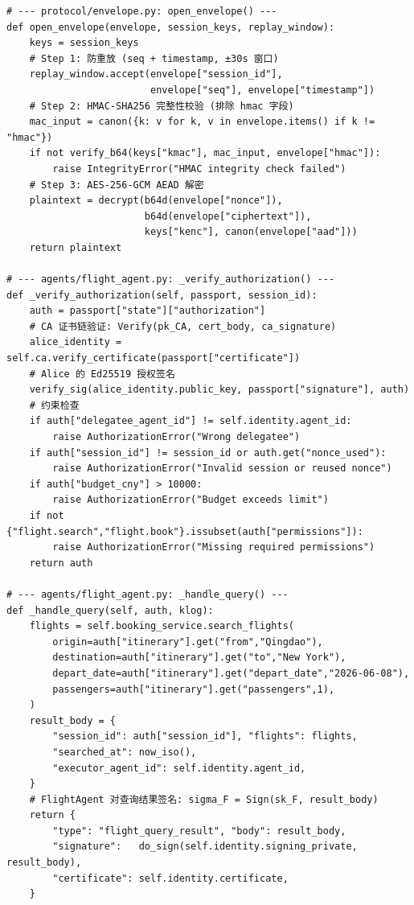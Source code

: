 \begin{lstlisting}[caption={protocol/envelope.py — open\_envelope() ; agents/flight\_agent.py — \_verify\_authorization() \& \_handle\_query()}]
# --- protocol/envelope.py: open_envelope() ---
def open_envelope(envelope, session_keys, replay_window):
    keys = session_keys
    # Step 1: 防重放 (seq + timestamp, ±30s 窗口)
    replay_window.accept(envelope["session_id"],
                         envelope["seq"], envelope["timestamp"])
    # Step 2: HMAC-SHA256 完整性校验 (排除 hmac 字段)
    mac_input = canon({k: v for k, v in envelope.items() if k != "hmac"})
    if not verify_b64(keys["kmac"], mac_input, envelope["hmac"]):
        raise IntegrityError("HMAC integrity check failed")
    # Step 3: AES-256-GCM AEAD 解密
    plaintext = decrypt(b64d(envelope["nonce"]),
                        b64d(envelope["ciphertext"]),
                        keys["kenc"], canon(envelope["aad"]))
    return plaintext

# --- agents/flight_agent.py: _verify_authorization() ---
def _verify_authorization(self, passport, session_id):
    auth = passport["state"]["authorization"]
    # CA 证书链验证: Verify(pk_CA, cert_body, ca_signature)
    alice_identity = self.ca.verify_certificate(passport["certificate"])
    # Alice 的 Ed25519 授权签名
    verify_sig(alice_identity.public_key, passport["signature"], auth)
    # 约束检查
    if auth["delegatee_agent_id"] != self.identity.agent_id:
        raise AuthorizationError("Wrong delegatee")
    if auth["session_id"] != session_id or auth.get("nonce_used"):
        raise AuthorizationError("Invalid session or reused nonce")
    if auth["budget_cny"] > 10000:
        raise AuthorizationError("Budget exceeds limit")
    if not {"flight.search","flight.book"}.issubset(auth["permissions"]):
        raise AuthorizationError("Missing required permissions")
    return auth

# --- agents/flight_agent.py: _handle_query() ---
def _handle_query(self, auth, klog):
    flights = self.booking_service.search_flights(
        origin=auth["itinerary"].get("from","Qingdao"),
        destination=auth["itinerary"].get("to","New York"),
        depart_date=auth["itinerary"].get("depart_date","2026-06-08"),
        passengers=auth["itinerary"].get("passengers",1),
    )
    result_body = {
        "session_id": auth["session_id"], "flights": flights,
        "searched_at": now_iso(),
        "executor_agent_id": self.identity.agent_id,
    }
    # FlightAgent 对查询结果签名: sigma_F = Sign(sk_F, result_body)
    return {
        "type": "flight_query_result", "body": result_body,
        "signature":   do_sign(self.identity.signing_private, result_body),
        "certificate": self.identity.certificate,
    }
\end{lstlisting}